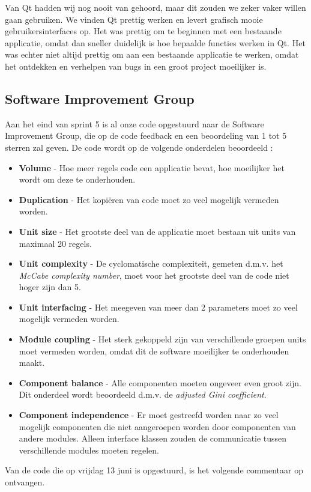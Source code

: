 Van Qt hadden wij nog nooit van gehoord, maar dit zouden we zeker vaker willen gaan gebruiken. We vinden Qt prettig werken en levert grafisch mooie gebruikersinterfaces op. Het was prettig om te beginnen met een bestaande applicatie, omdat dan sneller duidelijk is hoe bepaalde functies werken in Qt. Het was echter niet altijd prettig om aan een bestaande applicatie te werken, omdat het ontdekken en verhelpen van bugs in een groot project moeilijker is. 

\subsection{Software Improvement Group}
Aan het eind van sprint 5 is al onze code opgestuurd naar de Software Improvement Group, die op de code feedback en een beoordeling van 1 tot 5 sterren zal geven. De code wordt op de volgende onderdelen beoordeeld \cite{sigmanual}:
\begin{itemize}
\item \textbf{Volume} - Hoe meer regels code een applicatie bevat, hoe moeilijker het wordt om deze te onderhouden.
\item \textbf{Duplication} - Het kopi\"eren van code moet zo veel mogelijk vermeden worden.
\item \textbf{Unit size} - Het grootste deel van de applicatie moet bestaan uit units van maximaal 20 regels.
\item \textbf{Unit complexity} - De cyclomatische complexiteit, gemeten d.m.v. het \emph{McCabe complexity number}, moet voor het grootste deel van de code niet hoger zijn dan 5.
\item \textbf{Unit interfacing} - Het meegeven van meer dan 2 parameters moet zo veel mogelijk vermeden worden.
\item \textbf{Module coupling} - Het sterk gekoppeld zijn van verschillende groepen units moet vermeden worden, omdat dit de software moeilijker te onderhouden maakt.
\item \textbf{Component balance} - Alle componenten moeten ongeveer even groot zijn. Dit onderdeel wordt beoordeeld d.m.v. de \emph{adjusted Gini coefficient}.
\item \textbf{Component independence} - Er moet gestreefd worden naar zo veel mogelijk componenten die niet aangeroepen worden door componenten van andere modules. Alleen interface klassen zouden de communicatie tussen verschillende modules moeten regelen.
\end{itemize}

Van de code die op vrijdag 13 juni is opgestuurd, is het volgende commentaar op ontvangen.

